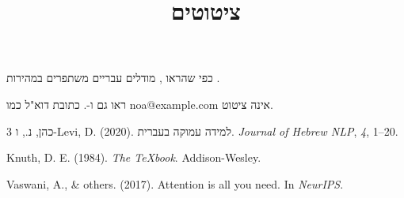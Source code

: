 \documentclass[11pt,a4paper]{article}
\title{ציטוטים}
\date{}
\begin{document}
\maketitle

כפי שהראו \citet{cohen2020}, מודלים עבריים משתפרים במהירות \citep{vaswani2017}.

ראו גם \citep[ראו][עמ'~33]{knuth1984} ו-\citep{cohen2020,vaswani2017}. כתובת דוא"ל כמו \foreignlanguage{english}{noa@example.com} אינה ציטוט.

\begin{thebibliography}{3}
 כהן, נ., ו-\foreignlanguage{english}{Levi, D}. (2020). למידה עמוקה בעברית. \emph{\foreignlanguage{english}{Journal of Hebrew NLP}}, \emph{4}, \foreignlanguage{english}{1–20}.

 \foreignlanguage{english}{Knuth, D. E. (1984). \emph{The TeXbook}. Addison-Wesley.}

 \foreignlanguage{english}{Vaswani, A., \& others. (2017). Attention is all you need. In \emph{NeurIPS}.}
\end{thebibliography}
\end{document}
